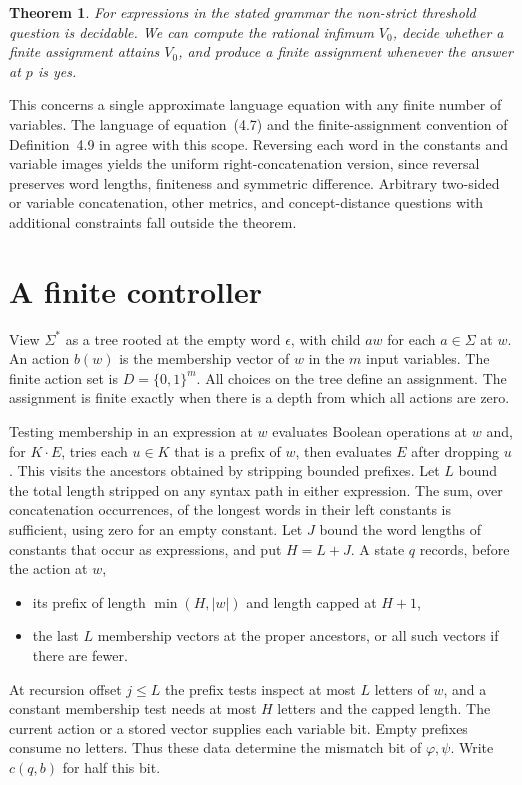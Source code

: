 \documentclass[11pt,a4paper]{amsart}
\newtheorem{theorem}{Theorem}
\begin{document}
\begin{theorem}\label{theo:main}
For expressions in the stated grammar the non-strict threshold question is decidable. We can compute the rational infimum \(V_0\), decide whether a finite assignment attains \(V_0\), and produce a finite assignment whenever the answer at \(p\) is yes.
\end{theorem}

This concerns a single approximate language equation with any finite number of variables. The language of equation~(4.7) and the finite-assignment convention of Definition~4.9 in \cite{marantidis} agree with this scope. Reversing each word in the constants and variable images yields the uniform right-concatenation version, since reversal preserves word lengths, finiteness and symmetric difference. Arbitrary two-sided or variable concatenation, other metrics, and concept-distance questions with additional constraints fall outside the theorem.

\section{A finite controller}
View \(\Sigma^*\) as a tree rooted at the empty word \(\epsilon\), with child \(aw\) for each \(a\in\Sigma\) at \(w\). An action \(b(w)\) is the membership vector of \(w\) in the \(m\) input variables. The finite action set is \(D=\{0,1\}^m\). All choices on the tree define an assignment. The assignment is finite exactly when there is a depth from which all actions are zero.

Testing membership in an expression at \(w\) evaluates Boolean operations at \(w\) and, for \(K\cdot E\), tries each \(u\in K\) that is a prefix of \(w\), then evaluates \(E\) after dropping \(u\). This visits the ancestors obtained by stripping bounded prefixes. Let \(L\) bound the total length stripped on any syntax path in either expression. The sum, over concatenation occurrences, of the longest words in their left constants is sufficient, using zero for an empty constant. Let \(J\) bound the word lengths of constants that occur as expressions, and put \(H=L+J\). A state \(q\) records, before the action at \(w\),
\begin{itemize}
\item its prefix of length \(\min(H,|w|)\) and length capped at \(H+1\),
\item the last \(L\) membership vectors at the proper ancestors, or all such vectors if there are fewer.
\end{itemize}
At recursion offset \(j\le L\) the prefix tests inspect at most \(L\) letters of \(w\), and a constant membership test needs at most \(H\) letters and the capped length. The current action or a stored vector supplies each variable bit. Empty prefixes consume no letters. Thus these data determine the mismatch bit of \(\varphi,\psi\). Write \(c(q,b)\) for half this bit.
\end{document}
